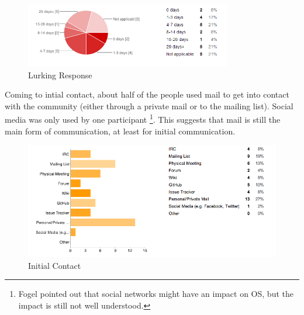 \begin{figure}[ht!]
\centering
\includegraphics[width=90mm]{chapters/img/lurking_response.png}
\caption{Lurking Response}
\label{overflow}
\end{figure}

Coming to intial contact, about half of the people used mail to get into contact with the community (either through a private mail or to the mailing list). Social media was only used by one participant \footnote{Fogel pointed out that social networks might have an impact on OS, but the impact is still not well understood.}. This suggests that mail is still the main form of communication, at least for initial communication.


\begin{figure}[ht!]
\centering
\includegraphics[width=120mm]{chapters/img/initial_contact.png}
\caption{Initial Contact }
\label{overflow}
\end{figure}